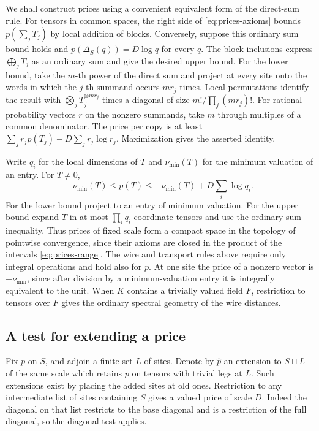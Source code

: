 We shall construct prices using a convenient equivalent form of the
direct-sum rule. For tensors in common spaces, the right side of
\eqref{eq:prices-axioms} bounds \(p(\sum_j T_j)\) by local addition
of blocks. Conversely, suppose this ordinary sum bound holds and
\(p(\Delta_S(q))=D\log q\) for every \(q\). The block inclusions
express \(\bigoplus_j T_j\) as an ordinary sum and give the desired
upper bound. For the lower bound, take the \(m\)-th power of the direct
sum and project at every site onto the words in which the \(j\)-th
summand occurs \(m r_j\) times. Local permutations identify the
result with \(\bigotimes_jT_j^{\otimes m r_j}\) times a diagonal of
size \(m!/\prod_j(mr_j)!\).
For rational probability vectors \(r\) on the nonzero summands,
take \(m\) through multiples of a common denominator. The price per copy
is at least \(\sum_jr_jp(T_j)-D\sum_j r_j\log r_j\).
Maximization gives the asserted identity.

Write \(q_i\) for the local dimensions of \(T\) and \(\nu_{\min}(T)\)
for the minimum valuation of an entry. For \(T\ne0\),
\begin{equation}\label{eq:prices-range}
 -\nu_{\min}(T)\le p(T)\le -\nu_{\min}(T)+D\sum_i\log q_i.
\end{equation}
For the lower bound project to an entry of minimum valuation. For the
upper bound expand \(T\) in at most \(\prod_iq_i\) coordinate tensors
and use the ordinary sum inequality. Thus prices of fixed
scale form a compact space in the topology of pointwise convergence,
since their axioms are closed in the product of the intervals
\eqref{eq:prices-range}. The wire and transport rules above require only
integral operations and hold also for \(p\). At one site the price of a
nonzero vector is \(-\nu_{\min}\), since after division by a minimum-valuation
entry it is integrally equivalent to the unit. When \(K\) contains a
trivially valued field \(F\), restriction to tensors
over \(F\) gives the ordinary spectral geometry of the wire distances.

\subsection{A test for extending a price}
Fix \(p\) on \(S\), and adjoin a finite set \(L\) of sites. Denote by
\(\widehat p\) an extension to \(S\sqcup L\) of the same scale which
retains \(p\) on tensors with trivial legs at \(L\). Such extensions
exist by placing the added sites at old ones. Restriction to any intermediate
list of sites containing \(S\) gives a valued price of scale \(D\).
Indeed the diagonal on that list restricts to the base diagonal and is a
restriction of the full diagonal, so the diagonal test applies. 

